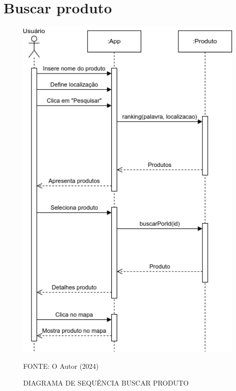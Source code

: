 \section{Buscar produto}
\begin{figure}[H]
    \caption{\label{fig:label} DIAGRAMA DE SEQUÊNCIA BUSCAR PRODUTO}
    \includegraphics[width = 140mm]{fig/sequencia/sequencia1.png}
    \footnotesize \centering
    \par FONTE: O Autor (2024)
\end{figure}

\pagebreak 

